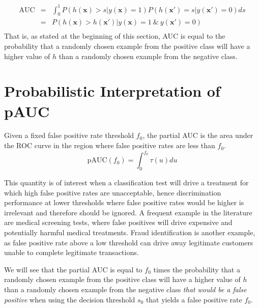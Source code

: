 \begin{equation*}
    \begin{array}{lcl}
    \textrm{AUC} & = & \int_0^1 P\left(h(\mathbf{x}) > s | y(\mathbf{x})=1\right) P\left(h(\mathbf{x}')=s | y(\mathbf{x}') = 0\right) ds \\
      & = & P\left(h(\mathbf{x}) > h(\mathbf{x}') | y(\mathbf{x})=1 \ \& \  y(\mathbf{x}') = 0\right) \\
    \end{array}
\end{equation*}
That is, as stated at the beginning of this section, AUC is equal to the probability that a randomly chosen example from the positive class will have a higher value of $h$ than a randomly chosen example from the negative class.

\section{Probabilistic Interpretation of pAUC}

Given a fixed false positive rate threshold $f_0$, the partial AUC is the area under the ROC curve in the region where false positive rates are less than $f_0$.
\begin{equation}
     \textrm{pAUC}(f_0) = \int_0^{f_0} \tau(u)du \label{eq:pauc}
\end{equation}

This quantity is of interest when a classification test will drive a treatment for which high false positive rates are unacceptable, hence discrimination performance at lower thresholds where false positive rates would be higher is irrelevant and therefore should be ignored.  A frequent example in the literature are medical screening tests, where false positives will drive expensive and potentially harmful medical treatments.  Fraud identification is another example, as false positive rate above a low threshold can drive away legitimate customers unable to complete legitimate transactions.

We will see that the partial AUC is equal to $f_0$ times the probability that a randomly chosen example from the positive class will have a higher value of $h$ than a randomly chosen example from the negative class \textit{that would be a false positive} when using the decision threshold $s_0$ that yields a false positive rate $f_0$.

